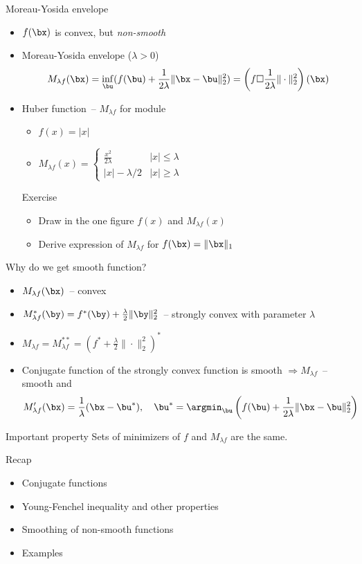 \documentclass[12pt]{beamer}
\begin{document}
\begin{frame}{Moreau-Yosida envelope}
\begin{itemize}
\item $f(\bx)$ is convex, but \emph{non-smooth}
\item Moreau-Yosida envelope ($\lambda > 0$)
\[
M_{\lambda f}(\bx) = \inf\limits_{\bu} (f(\bu) + \frac{1}{2\lambda}\|\bx - \bu\|^2_2) = \left(f \square \frac{1}{2\lambda} \|\cdot\|_2^2\right)(\bx)
\]
\item Huber function~-- $M_{\lambda f}$ for module
\begin{itemize}
\item $f(x) = |x|$
\item $M_{\lambda f}(x) = 
\begin{cases}
\frac{x^2}{2\lambda} & |x| \leq \lambda\\
|x| - \lambda / 2 & |x| \geq \lambda
\end{cases}$
\end{itemize}
\begin{block}{Exercise}
\begin{itemize}
\item Draw in the one figure $f(x)$ and $M_{\lambda f}(x)$
\item Derive expression of $M_{\lambda f}$ for $f(\bx) = \|\bx\|_1$ 
\end{itemize}
\end{block}
\end{itemize}

\end{frame}

\begin{frame}{Why do we get smooth function?}
\begin{itemize}
\item $M_{\lambda f}(\bx)$~-- convex
\item $M^*_{\lambda f}(\by) = f^*(\by) + \frac{\lambda}{2}\|\by\|_2^2$~-- strongly convex with parameter $\lambda$
\item $M_{\lambda f} = M^{**}_{\lambda f} = (f^* + \frac{\lambda}{2}\|\cdot \|_2^2)^*$
\item Conjugate function of the strongly convex function is smooth $\Rightarrow M_{\lambda f}$~-- smooth and 
\[
M'_{\lambda f}(\bx) = \frac{1}{\lambda} (\bx - \bu^*), \quad \bu^* = \argmin_{\bu} \left(f(\bu) + \frac{1}{2\lambda}\|\bx - \bu\|^2_2\right) 
\]
\end{itemize}

\begin{block}{Important property}
Sets of minimizers of $f$ and $M_{\lambda f}$ are the same.
\end{block}

\end{frame}

\begin{frame}{Recap}

\begin{itemize}
\item Conjugate functions
\item Young-Fenchel inequality and other properties
\item Smoothing of non-smooth functions
\item Examples
\end{itemize}

\end{frame}
\end{document}
